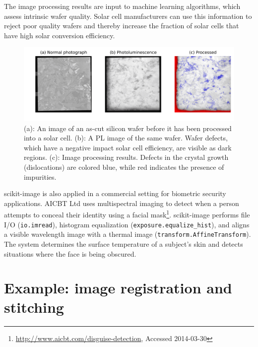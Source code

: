 \documentclass[fleqn,12pt]{wlpeerj}
\begin{document}
The image processing results are input to machine learning algorithms, which assess intrinsic wafer quality. Solar cell manufacturers can use this information to reject poor quality wafers and thereby increase the fraction of solar cells that have high solar conversion efficiency.

\begin{figure}[bht]

    \includegraphics[width=\columnwidth]{fig_pl_new.png}

    \caption{(a): An image of an as-cut silicon wafer before it has been processed into a solar cell. (b): A PL image of the same wafer. Wafer defects, which have a negative impact solar cell efficiency, are visible as dark regions. (c): Image processing results. Defects in the crystal growth (dislocations) are colored blue, while red indicates the presence of impurities. \label{fig:PL}}
\end{figure}

scikit-image is also applied in a commercial setting for biometric security applications. AICBT Ltd uses multispectral imaging to detect when a person attempts to conceal their identity using a facial mask\footnote{\url{http://www.aicbt.com/disguise-detection}, Accessed 2014-03-30}. scikit-image performs file I/O (\texttt{io.imread}), histogram equalization (\texttt{exposure.equalize\_hist}), and aligns a visible wavelength image with a thermal image (\texttt{transform.AffineTransform}). The system determines the surface temperature of a subject's skin and detects situations where the face is being obscured.



\section*{Example: image registration and stitching}
\label{sec:example-image-registration-and-stitching}
\end{document}

